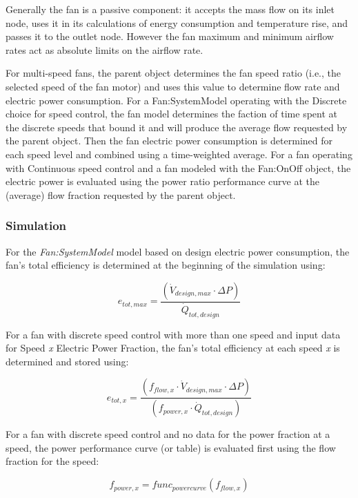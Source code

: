 Generally the fan is a passive component: it accepts the mass flow on its inlet node, uses it in its calculations of energy consumption and temperature rise, and passes it to the outlet node. However the fan maximum and minimum airflow rates act as absolute limits on the airflow rate.

For multi-speed fans, the parent object determines the fan speed ratio (i.e., the selected speed of the fan motor) and uses this value to determine flow rate and electric power consumption.  For a Fan:SystemModel operating with the Discrete choice for speed control, the fan model determines the faction of time spent at the discrete speeds that bound it and will produce the average flow requested by the parent object.  Then the fan electric power consumption is determined for each speed level and combined using a time-weighted average.  For a fan operating with Continuous speed control and a fan modeled with the Fan:OnOff object, the electric power is evaluated using the power ratio performance curve at the (average) flow fraction requested by the parent object. 

\subsubsection{Simulation}\label{simulation}

For the \emph{Fan:SystemModel} model based on design electric power consumption, the fan's total efficiency is determined at the beginning of the simulation using:

\begin{equation}
{e_{tot,max}} = \frac{({\dot V_{design,max} \cdot \Delta P  } )}{{ \dot Q_{tot, design}}}
\end{equation}

For a fan with discrete speed control with more than one speed and input data for Speed \emph{x} Electric Power Fraction, the fan's total efficiency at each speed \emph{x} is determined and stored using:

\begin{equation}
{e_{tot,x}} = \frac {({f_{flow,x}} \cdot {\dot V_{design,max} \cdot \Delta P  } )}{( {f_{power,x}} \cdot { \dot Q_{tot, design}})}
\end{equation}

For a fan with discrete speed control and no data for the power fraction at a speed, the power performance curve (or table) is evaluated first using the flow fraction for the speed:

\begin{equation}
{f_{power,x}} =  {func_{power curve}}({f_{flow,x}})
\end{equation}

